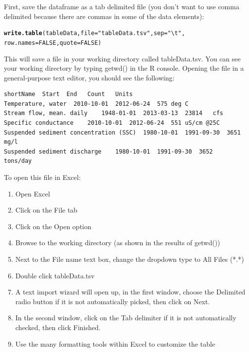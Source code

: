 \documentclass[a4paper,11pt]{article}\usepackage[]{graphicx}\usepackage[]{color}
\makeatletter
\newcommand{\hlnum}[1]{\textcolor[rgb]{0.686,0.059,0.569}{#1}}%
\newcommand{\hlstr}[1]{\textcolor[rgb]{0.192,0.494,0.8}{#1}}%
\newcommand{\hlstd}[1]{\textcolor[rgb]{0.345,0.345,0.345}{#1}}%
\newcommand{\hlkwc}[1]{\textcolor[rgb]{0.333,0.667,0.333}{#1}}%
\newcommand{\hlkwd}[1]{\textcolor[rgb]{0.737,0.353,0.396}{\textbf{#1}}}%
\newenvironment{kframe}{%
 \def\at@end@of@kframe{}%
 \ifinner\ifhmode%
  \def\at@end@of@kframe{\end{minipage}}%
  \begin{minipage}{\columnwidth}%
 \fi\fi%
 \def\FrameCommand##1{\hskip\@totalleftmargin \hskip-\fboxsep
 \colorbox{shadecolor}{##1}\hskip-\fboxsep
     \hskip-\linewidth \hskip-\@totalleftmargin \hskip\columnwidth}%
 \MakeFramed {\advance\hsize-\width
   \@totalleftmargin\z@ \linewidth\hsize
   \@setminipage}}%
 {\par\unskip\endMakeFramed%
 \at@end@of@kframe}
\newenvironment{knitrout}{}{} %
\makeatother
\begin{document}
First, save the dataframe as a tab delimited file (you don't want to use comma delimited because there are commas in some of the data elements):


\begin{knitrout}
\color{fgcolor}\begin{kframe}
\begin{alltt}
\hlkwd{write.table}\hlstd{(tableData,} \hlkwc{file}\hlstd{=}\hlstr{"tableData.tsv"}\hlstd{,}\hlkwc{sep}\hlstd{=}\hlstr{"\textbackslash{}t"}\hlstd{,}
            \hlkwc{row.names} \hlstd{=} \hlnum{FALSE}\hlstd{,}\hlkwc{quote}\hlstd{=}\hlnum{FALSE}\hlstd{)}
\end{alltt}
\end{kframe}
\end{knitrout}


This will save a file in your working directory called tableData.tsv.  You can see your working directory by typing getwd() in the R console. Opening the file in a general-purpose text editor, you should see the following:

\begin{verbatim}
shortName  Start  End	Count	Units
Temperature, water	2010-10-01	2012-06-24	575	deg C
Stream flow, mean. daily	1948-01-01	2013-03-13	23814	cfs
Specific conductance	2010-10-01	2012-06-24	551	uS/cm @25C
Suspended sediment concentration (SSC)	1980-10-01	1991-09-30	3651	mg/l
Suspended sediment discharge	1980-10-01	1991-09-30	3652	tons/day
\end{verbatim}

To open this file in Excel:
\begin{enumerate}
\item Open Excel
\item Click on the File tab
\item Click on the Open option
\item Browse to the working directory (as shown in the results of getwd())
\item Next to the File name text box, change the dropdown type to All Files (*.*)
\item Double click tableData.tsv
\item A text import wizard will open up, in the first window, choose the Delimited radio button if it is not automatically picked, then click on Next.
\item In the second window, click on the Tab delimiter if it is not automatically checked, then click Finished.
\item Use the many formatting tools within Excel to customize the table
\end{enumerate}
\end{document}
